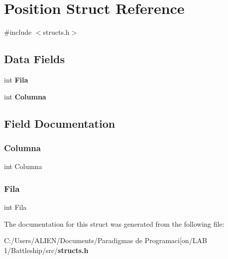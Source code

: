 \section{Position Struct Reference}
\label{struct_position}


{\ttfamily \#include $<$structs.\+h$>$}

\subsection*{Data Fields}
\begin{DoxyCompactItemize}
\item 
int {\bf Fila}
\item 
int {\bf Columna}
\end{DoxyCompactItemize}


\subsection{Field Documentation}
\label{struct_position_ac586570d8b2c7b26ff9eab744dbba342} 
\subsubsection{Columna}
{\footnotesize\ttfamily int Columna}

\label{struct_position_a37bb2663aeb061eb0077e632fda7ce83} 
\subsubsection{Fila}
{\footnotesize\ttfamily int Fila}



The documentation for this struct was generated from the following file\+:\begin{DoxyCompactItemize}
\item 
C\+:/\+Users/\+A\+L\+I\+E\+N/\+Documents/\+Paradigmas de Programaci[on/\+L\+A\+B 1/\+Battleship/src/{\bf structs.\+h}\end{DoxyCompactItemize}
